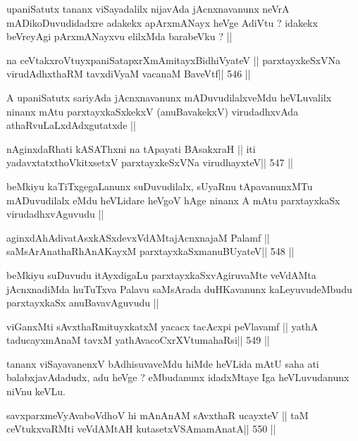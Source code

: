 \begin{artha}
upaniSatutx tananx viSayadalilx nijavAda jAcnxnavanunx neVrA
mADikoDuvudidadxre adakekx apArxmANayx heVge AdiVtu ? idakekx
beVreyAgi pArxmANayxvu elilxMda barabeVku ? ||
\end{artha}

\begin{shl}
na ceVtakxroVtuyxpaniSatapxrXmAmitayxBidhiVyateV ||
parxtayxkeSxVNa virudAdhxthaRM tavxdiVyaM vacanaM BaveVtf\hfill || 546 ||
\end{shl}

\begin{artha}
A upaniSatutx sariyAda jAcnxnavanunx mADuvudilalxveMdu heVLuvalilx
ninanx mAtu parxtayxkaSxkekxV (anuBavakekxV) virudadhxvAda
athaRvuLaLxdAdxgutatxde ||
\end{artha}

\begin{shl}
nAginxdaRhati kASAThxni na tApayati BAsakxraH ||
iti yadavxtatxthoVkitxsetxV parxtayxkeSxVNa virudhayxteV\hfill || 547 ||
\end{shl}

\begin{artha}
beMkiyu kaTiTxgegaLanunx suDuvudilalx, sUyaRnu tApavanunxMTu
mADuvudilalx eMdu heVLidare heVgoV hAge ninanx A mAtu parxtayxkaSx
virudadhxvAguvudu ||
\end{artha}

\begin{shl}
aginxdAhAdivatAsxkASxdevxVdAMtajAcnxnajaM Palamf ||
saMsArAnathaRhAnAKayxM parxtayxkaSxmanuBUyateV\hfill || 548 ||
\end{shl}

\begin{artha}
beMkiyu suDuvudu itAyxdigaLu parxtayxkaSxvAgiruvaMte veVdAMta
jAcnxnadiMda huTuTxva Palavu saMsArada duHKavanunx kaLeyuvudeMbudu
parxtayxkaSx anuBavavAguvudu ||
\end{artha}

\begin{shl}
viGanxMti sAvxthaRmituyxkatxM yacacx tacAcxpi peVlavamf ||
yathA taducayxmAnaM tavxM yathAvacoCxrXVtumahaRsi\hfill || 549 ||
\end{shl}

\begin{artha}
tananx viSayavanenxV bAdhisuvaveMdu hiMde heVLida mAtU saha ati
balabxjavAdadudx, adu heVge ? eMbudanunx idadxMtaye Iga heVLuvudanunx
niVnu keVLu.
\end{artha}

\begin{shl}
savxparxmeVyAvaboVdhoV hi mAnAnAM sAvxthaR ucayxteV ||
taM ceVtukxvaRMti veVdAMtAH kutasetxVSAmamAnatA\hfill || 550 ||
\end{shl}

